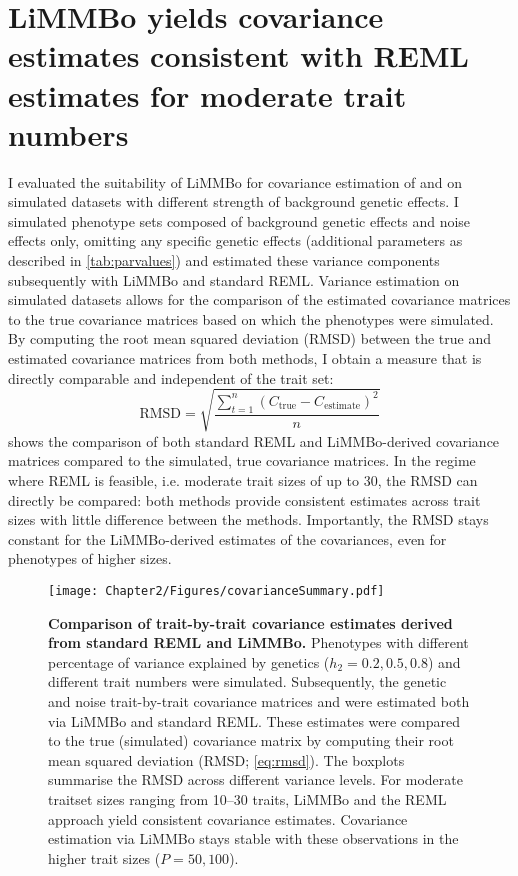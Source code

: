 \section{LiMMBo yields covariance estimates consistent with REML estimates for moderate trait numbers}
\label{section:covariance-limmbo}
I evaluated the suitability of LiMMBo for covariance estimation of  and  on simulated datasets with different strength of background genetic effects. I simulated phenotype sets composed of background genetic effects  and noise effects \tmat{\Psi} only, omitting any specific genetic effects (additional parameters as described in \cref{tab:parvalues}) and estimated these variance components subsequently with LiMMBo and standard REML. Variance estimation on simulated datasets allows for the comparison of the estimated covariance matrices to the true covariance matrices based on which the phenotypes were simulated. By computing the root mean squared deviation (RMSD) between the true and estimated covariance matrices from both methods, I obtain a measure that is directly comparable and independent of the trait set: 
\begin{equation}
\text{RMSD}=\sqrt{\frac{\sum_{t=1}^n (C_{\text{true}} - C_{\text{estimate}})^2}{n}}
\label{eq:rmsd}
\end{equation}
 shows the comparison of both standard REML and LiMMBo-derived covariance matrices compared to the simulated, true covariance matrices. In the regime where REML is feasible, i.e. moderate trait sizes of up to \num{30}, the RMSD can directly be compared: both methods provide consistent estimates across trait sizes with little difference between the methods. Importantly, the RMSD stays constant for the LiMMBo-derived estimates of the covariances, even for phenotypes of higher sizes. 

\begin{figure}[h]
	\centering	
	\texttt{[image: Chapter2/Figures/covarianceSummary.pdf]}\\
	\caption[\textbf{Comparison of trait-by-trait covariance estimates derived from standard REML and LiMMBo.}]{\textbf{Comparison of trait-by-trait covariance estimates derived from standard REML and LiMMBo.} Phenotypes with different percentage of variance explained by genetics (\(h_2={0.2, 0.5, 0.8}\)) and different trait numbers were simulated. Subsequently, the genetic and noise trait-by-trait covariance matrices  and  were estimated both via LiMMBo and standard REML. These estimates were compared to the true (simulated) covariance matrix by computing their root mean squared deviation (RMSD; \cref{eq:rmsd}). The boxplots summarise the RMSD across different variance levels. For moderate traitset sizes ranging from \numrange{10}{30} traits, LiMMBo and the REML approach yield consistent covariance estimates. Covariance estimation via LiMMBo stays stable with these observations in the higher trait sizes (\(P={50,100}\)). }
	  \label{fig:covsimilarity}%
\end{figure}


